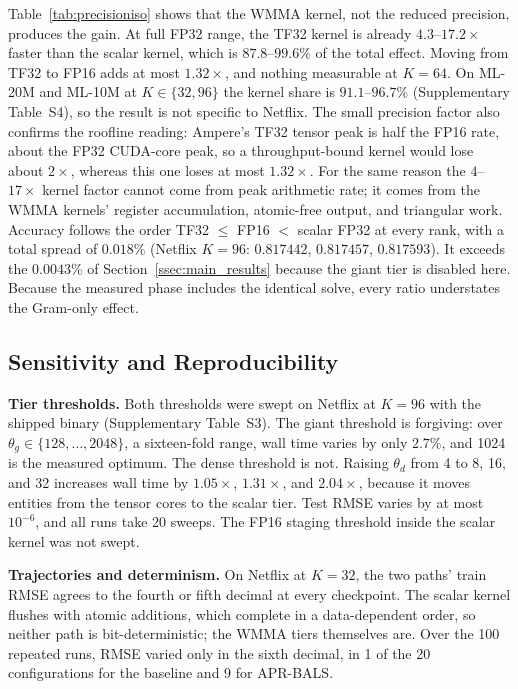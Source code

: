 Table~\ref{tab:precisioniso} shows that the WMMA kernel, not the reduced precision, produces the gain. At full FP32 range, the TF32 kernel is already $4.3$--$17.2\times$ faster than the scalar kernel, which is $87.8$--$99.6\%$ of the total effect. Moving from TF32 to FP16 adds at most $1.32\times$, and nothing measurable at $K=64$. On ML-20M and ML-10M at $K \in \{32, 96\}$ the kernel share is $91.1$--$96.7\%$ (Supplementary Table~S4), so the result is not specific to Netflix. The small precision factor also confirms the roofline reading: Ampere's TF32 tensor peak is half the FP16 rate, about the FP32 CUDA-core peak, so a throughput-bound kernel would lose about $2\times$, whereas this one loses at most $1.32\times$. For the same reason the $4$--$17\times$ kernel factor cannot come from peak arithmetic rate; it comes from the WMMA kernels' register accumulation, atomic-free output, and triangular work. Accuracy follows the order TF32 $\le$ FP16 $<$ scalar FP32 at every rank, with a total spread of $0.018\%$ (Netflix $K=96$: $0.817442$, $0.817457$, $0.817593$). It exceeds the $0.0043\%$ of Section~\ref{ssec:main_results} because the giant tier is disabled here. Because the measured phase includes the identical solve, every ratio understates the Gram-only effect.

\subsection{Sensitivity and Reproducibility}
\label{ssec:sensitivity}

\textbf{Tier thresholds.} Both thresholds were swept on Netflix at $K=96$ with the shipped binary (Supplementary Table~S3). The giant threshold is forgiving: over $\theta_g \in \{128, \dots, 2048\}$, a sixteen-fold range, wall time varies by only $2.7\%$, and 1024 is the measured optimum. The dense threshold is not. Raising $\theta_d$ from 4 to 8, 16, and 32 increases wall time by $1.05\times$, $1.31\times$, and $2.04\times$, because it moves entities from the tensor cores to the scalar tier. Test RMSE varies by at most $10^{-6}$, and all runs take 20 sweeps. The FP16 staging threshold inside the scalar kernel was not swept.

\textbf{Trajectories and determinism.} On Netflix at $K=32$, the two paths' train RMSE agrees to the fourth or fifth decimal at every checkpoint. The scalar kernel flushes with atomic additions, which complete in a data-dependent order, so neither path is bit-deterministic; the WMMA tiers themselves are. Over the 100 repeated runs, RMSE varied only in the sixth decimal, in 1 of the 20 configurations for the baseline and 9 for APR-BALS.
